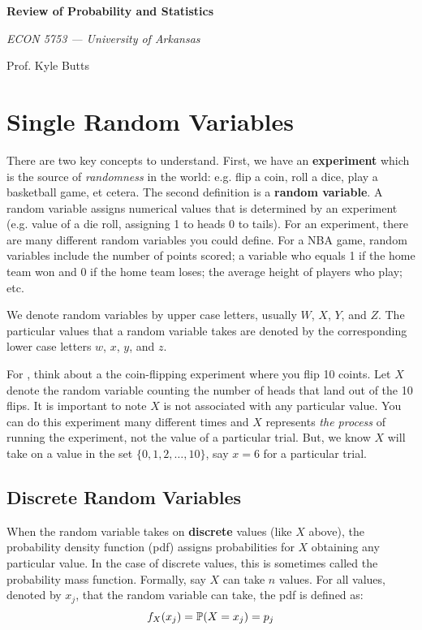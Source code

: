 \documentclass[12pt]{article}
\begin{document}
\begin{center}
  {\Huge\bf Review of Probability and Statistics}

  \smallskip
  {\large\it ECON 5753 — University of Arkansas}

  \medskip
  {\large Prof. Kyle Butts}
\end{center}

\section{Single Random Variables}

There are two key concepts to understand. First, we have an \textbf{experiment} which is the source of \emph{randomness} in the world: e.g. flip a coin, roll a dice, play a basketball game, et cetera. The second definition is a \textbf{random variable}. A random variable assigns numerical values that is determined by an experiment (e.g. value of a die roll, assigning 1 to heads 0 to tails). For an experiment, there are many different random variables you could define. For a NBA game, random variables include the number of points scored; a variable who equals 1 if the home team won and 0 if the home team loses; the average height of players who play; etc.

We denote random variables by upper case letters, usually $W$, $X$, $Y$,
and $Z$. The particular values that a random variable takes are denoted by the corresponding lower case letters $w$, $x$, $y$, and $z$.

For , think about a the coin-flipping experiment where you flip 10 coints. Let $X$ denote the random variable counting the number of heads that land out of the 10 flips. It is important to note $X$ is not associated with any particular value. You can do this experiment many different times and $X$ represents \emph{the process} of running the experiment, not the value of a particular trial. But, we know $X$ will take on a value in the set $\{ 0, 1, 2, \dots, 10 \}$, say $x = 6$ for a particular trial.


\subsection*{Discrete Random Variables}

When the random variable takes on \textbf{discrete} values (like $X$ above), the probability density function (pdf) assigns probabilities for $X$ obtaining any particular value. In the case of discrete values, this is sometimes called the probability mass function. Formally, say $X$ can take $n$ values. For all values, denoted by $x_j$, that the random variable can take, the pdf is defined as:
$$
  f_{X}(x_j) = \P{X = x_j} = p_j
$$
\end{document}
